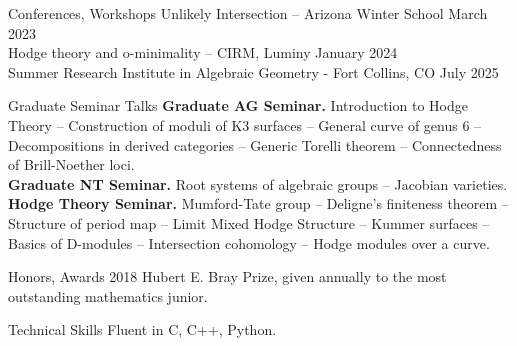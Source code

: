 \documentclass[
	12pt, %
]{resume} %
\begin{document}
\begin{rSection}{Conferences, Workshops}
    Unlikely Intersection -- Arizona Winter School \hfill March 2023\\
    Hodge theory and o-minimality -- CIRM, Luminy \hfill January 2024\\
    Summer Research Institute in Algebraic Geometry - Fort Collins, CO \hfill July 2025
\end{rSection}

\begin{rSection}{Graduate Seminar Talks}
    \textbf{Graduate AG Seminar.} Introduction to Hodge Theory -- Construction of moduli of K3 surfaces -- General curve of genus 6 -- Decompositions in derived categories -- Generic Torelli theorem -- Connectedness of Brill-Noether loci.\\
    \textbf{Graduate NT Seminar.} Root systems of algebraic groups -- Jacobian varieties. \\
    \textbf{Hodge Theory Seminar.} Mumford-Tate group -- Deligne's finiteness theorem -- Structure of period map -- Limit Mixed Hodge Structure -- Kummer surfaces -- Basics of D-modules -- Intersection cohomology -- Hodge modules over a curve. 
\end{rSection}
\begin{rSection}{Honors, Awards}
    2018 Hubert E. Bray Prize, given annually to the most outstanding mathematics junior.
\end{rSection}
\begin{rSection}{Technical Skills}
    Fluent in C, C++, Python. 
\end{rSection}
\end{document}
